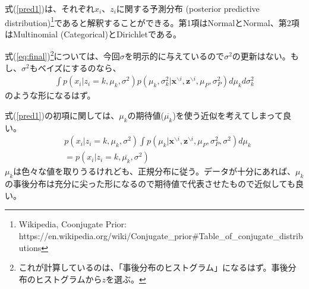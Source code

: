 \documentclass[a4paper,10.5pt,uplatex]{jsarticle}  %
\newcommand{\bz}{\mathbf{z}}
\newcommand{\bx}{\mathbf{x}}
\newcommand{\deli}{{\backslash i}}
\begin{document}
式(\ref{pred1})は、それぞれ$x_i$、$z_i$に関する予測分布 (posterior predictive distribution)\footnote{Wikipedia, Coonjugate Prior: https://en.wikipedia.org/wiki/Conjugate\_prior\#Table\_of\_conjugate\_distributions}であると解釈することができる。第1項はNormalとNormal、第2項はMultinomial (Categorical)とDirichletである。\par
式(\ref{eq:final})\footnote{これが計算しているのは、「事後分布のヒストグラム」になるはず。事後分布のヒストグラムから$z$を選ぶ。}については、今回$\sigma$を明示的に与えているので$\sigma^2$の更新はない。もし、$\sigma^2$もベイズにするのなら、
\begin{align}
\int p(x_i | z_i=k, \mu_k, \sigma^2) p(\mu_k, \sigma_k^2 | \bx^\deli, \bz^\deli, \mu_P, \sigma^2_P ) d\mu_k d \sigma_k^2
\end{align}
のような形になるはず。\par
式(\ref{pred1})の初項に関しては、$\mu_k$の期待値($\overline{\mu_k}$)を使う近似を考えてしまって良い。
\begin{align}
  & p(x_i | z_i=k, {\mu_k}, \sigma^2) \int  p(\mu_k | \bx^\deli, \bz^\deli, \mu_P, \sigma^2_P, \sigma^2) d\mu_k\\
  &= p(x_i | z_i=k, \overline{\mu_k}, \sigma^2)
\end{align}
$\mu_k$は色々な値を取りうるけれども、正規分布に従う。データが十分にあれば、$\mu_k$の事後分布は充分に尖った形になるので期待値で代表させたもので近似しても良い。
\end{document}
